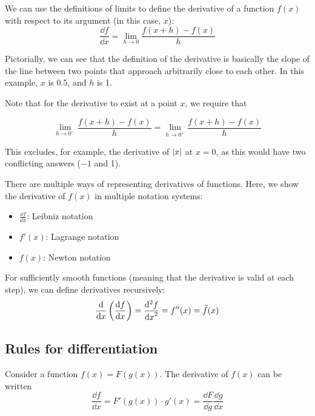 \begin{definition}[Derivative]
	We can use the definitions of limits to define the derivative of a function \(f(x)\) with respect to its argument (in this case, \(x\)):
	\begin{equation}\label{derivative}
		\frac{\dd{f}}{\dd{x}} = \lim_{h \to 0} \frac{f(x+h)-f(x)}{h}
	\end{equation}
\end{definition}

Pictorially, we can see that the definition of the derivative is basically the slope of the line between two points that approach arbitrarily close to each other.
In this example, \(x\) is 0.5, and \(h\) is 1.

Note that for the derivative to exist at a point \(x\), we require that

\[
	\lim_{h \to 0^-} \frac{f(x+h)-f(x)}{h} = \lim_{h \to 0^+} \frac{f(x+h)-f(x)}{h}
\]

This excludes, for example, the derivative of \(\abs{x}\) at \(x=0\), as this would have two conflicting answers (\(-1\) and 1).

There are multiple ways of representing derivatives of functions.
Here, we show the derivative of \(f(x)\) in multiple notation systems:
\begin{itemize}
	\item \(\displaystyle \frac{\dd{f}}{\dd{x}}\): Leibniz notation
	\item \(f'(x)\): Lagrange notation
	\item \(\dot f (x)\): Newton notation
\end{itemize}

For sufficiently smooth functions (meaning that the derivative is valid at each step), we can define derivatives recursively:
\[
	\frac{\mathrm{d}}{\dd{x}}\left( \frac{\dd{f}}{\dd{x}} \right)
	= \frac{\mathrm{d}^2f}{\dd{x}^2}
	= f''(x) = \ddot f (x)
\]

\subsection{Rules for differentiation}
\begin{definition}
	Consider a function \(f(x) = F(g(x))\).
	The derivative of \(f(x)\) can be written
	\begin{equation}
		\frac{\dd{f}}{\dd{x}} = F'(g(x)) \cdot g'(x) = \frac{\dd{F}}{\dd{g}} \frac{\dd{g}}{\dd{x}}
	\end{equation}
\end{definition}

